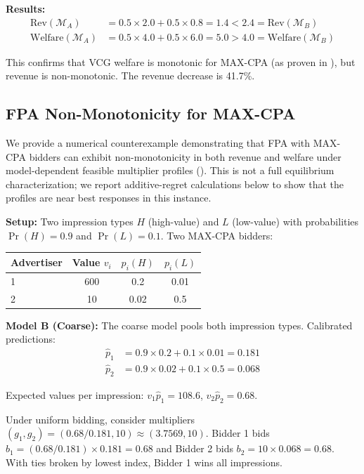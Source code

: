 \documentclass{article}
\theoremstyle{plain}
\theoremstyle{definition}
\theoremstyle{remark}
\newcommand{\cM}{\mathcal{M}}
\begin{document}
\textbf{Results:}
\begin{align}
\text{Rev}(\cM_A) &= 0.5 \times 2.0 + 0.5 \times 0.8 = 1.4 < 2.4 = \text{Rev}(\cM_B) \\
\text{Welfare}(\cM_A) &= 0.5 \times 4.0 + 0.5 \times 6.0 = 5.0 > 4.0 = \text{Welfare}(\cM_B)
\end{align}

This confirms that VCG welfare is monotonic for MAX-CPA (as proven in ), but revenue is non-monotonic. The revenue decrease is 41.7\%.

\subsection{FPA Non-Monotonicity for MAX-CPA}
\label{app:counter-maxcpa-fpa}

We provide a numerical counterexample demonstrating that FPA with MAX-CPA bidders can exhibit non-monotonicity in both revenue and welfare under model-dependent feasible multiplier profiles (). This is not a full equilibrium characterization; we report additive-regret calculations below to show that the profiles are near best responses in this instance.

\textbf{Setup:} Two impression types $H$ (high-value) and $L$ (low-value) with probabilities $\Pr(H) = 0.9$ and $\Pr(L) = 0.1$. Two MAX-CPA bidders:

\begin{center}
\begin{tabular}{lccc}
\toprule
Advertiser & Value $v_i$ & $p_i(H)$ & $p_i(L)$ \\
\midrule
1 & 600 & 0.2 & 0.01 \\
2 & 10 & 0.02 & 0.5 \\
\bottomrule
\end{tabular}
\end{center}

\textbf{Model B (Coarse):} The coarse model pools both impression types. Calibrated predictions:
\begin{align}
\hat{p}_1 &= 0.9 \times 0.2 + 0.1 \times 0.01 = 0.181 \\
\hat{p}_2 &= 0.9 \times 0.02 + 0.1 \times 0.5 = 0.068
\end{align}

Expected values per impression: $v_1 \hat{p}_1 = 108.6$, $v_2 \hat{p}_2 = 0.68$.

Under uniform bidding, consider multipliers $(g_1, g_2) = (0.68/0.181, 10) \approx (3.7569, 10)$. Bidder 1 bids $b_1 = (0.68/0.181) \times 0.181 = 0.68$ and Bidder 2 bids $b_2 = 10 \times 0.068 = 0.68$. With ties broken by lowest index, Bidder 1 wins all impressions.
\end{document}

